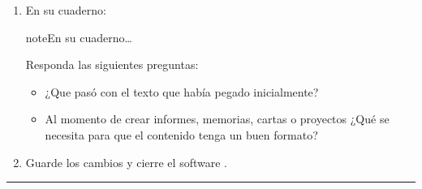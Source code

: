 \documentclass[letterpaper,10pt,spanish]{sphinxmanual}
\begin{document}
\begin{enumerate}
\begin{itemize}
\begin{itemize}
\begin{itemize}
\end{itemize}

\item {} 
\sphinxAtStartPar
En la sección  configurar:
\begin{itemize}
\item {} 
\sphinxAtStartPar
{} Proyectar sombra a la parte inferior derecha

\item {} 
\sphinxAtStartPar
{} Lima

\end{itemize}

\end{itemize}

\item {} 
\sphinxAtStartPar
Pulsar el botón 

\end{itemize}

\item {} 
\sphinxAtStartPar
En su cuaderno:

\begin{sphinxadmonition}{note}{En su cuaderno…}

\sphinxAtStartPar
Responda las siguientes preguntas:
\begin{itemize}
\item {} 
\sphinxAtStartPar
¿Que pasó con el texto que había pegado inicialmente?

\item {} 
\sphinxAtStartPar
Al momento de crear informes, memorias, cartas o proyectos ¿Qué se necesita para que el contenido tenga un buen formato?

\end{itemize}
\end{sphinxadmonition}

\item {} 
\sphinxAtStartPar
Guarde los cambios y cierre el software .

\end{enumerate}


\bigskip\hrule\bigskip
\end{document}
